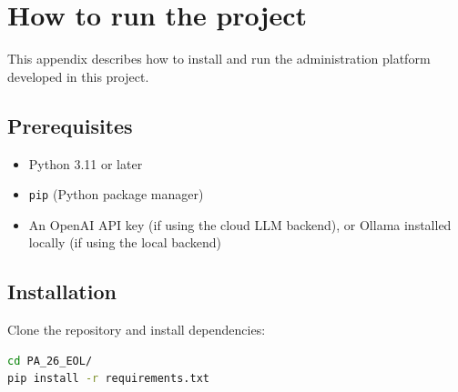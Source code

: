 %
%
%


\chapter{How to run the project}
\renewcommand{\thepage}{\thechapter-\arabic{page}}

This appendix describes how to install and run the administration platform developed in this project.

\section{Prerequisites}

\begin{itemize}
    \item Python 3.11 or later
    \item \texttt{pip} (Python package manager)
    \item An OpenAI API key (if using the cloud LLM backend), or Ollama installed locally (if using the local backend)
\end{itemize}

\section{Installation}

Clone the repository and install dependencies:

\begin{lstlisting}[language=bash]
cd PA_26_EOL/
pip install -r requirements.txt
\end{lstlisting}

